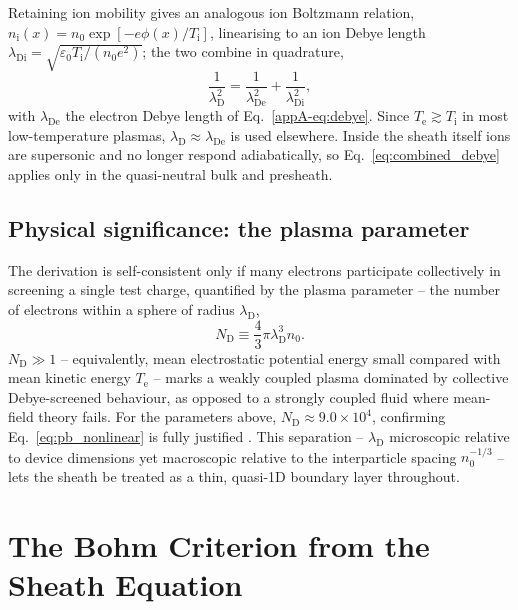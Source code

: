 Retaining ion mobility gives an analogous ion Boltzmann relation, $n_{\mathrm{i}}(x) = n_{0}\exp[-e\phi(x)/T_{\mathrm{i}}]$, linearising to an ion Debye length $\lambda_{\mathrm{Di}} = \sqrt{\varepsilon_{0}T_{\mathrm{i}}/(n_{0}e^{2})}$; the two combine in quadrature,
\begin{equation}
\frac{1}{\lambda_{\mathrm{D}}^{2}} = \frac{1}{\lambda_{\mathrm{De}}^{2}} + \frac{1}{\lambda_{\mathrm{Di}}^{2}},
\label{eq:combined_debye}
\end{equation}
with $\lambda_{\mathrm{De}}$ the electron Debye length of Eq.~\eqref{appA-eq:debye}. Since $T_{\mathrm{e}} \gtrsim T_{\mathrm{i}}$ in most low-temperature plasmas, $\lambda_{\mathrm{D}} \approx \lambda_{\mathrm{De}}$ is used elsewhere. Inside the sheath itself ions are supersonic and no longer respond adiabatically, so Eq.~\eqref{eq:combined_debye} applies only in the quasi-neutral bulk and presheath.

\subsection{Physical significance: the plasma parameter}

The derivation is self-consistent only if many electrons participate collectively in screening a single test charge, quantified by the plasma parameter -- the number of electrons within a sphere of radius $\lambda_{\mathrm{D}}$,
\begin{equation}
N_{\mathrm{D}} \equiv \frac{4}{3}\pi\lambda_{\mathrm{D}}^{3}n_{0}.
\label{eq:plasma_parameter}
\end{equation}
$N_{\mathrm{D}} \gg 1$ -- equivalently, mean electrostatic potential energy small compared with mean kinetic energy $T_{\mathrm{e}}$ -- marks a weakly coupled plasma dominated by collective Debye-screened behaviour, as opposed to a strongly coupled fluid where mean-field theory fails. For the parameters above, $N_{\mathrm{D}} \approx 9.0\times10^{4}$, confirming Eq.~\eqref{eq:pb_nonlinear} is fully justified \cite{ref0013}. This separation -- $\lambda_{\mathrm{D}}$ microscopic relative to device dimensions yet macroscopic relative to the interparticle spacing $n_{0}^{-1/3}$ -- lets the sheath be treated as a thin, quasi-1D boundary layer throughout.

\section{The Bohm Criterion from the Sheath Equation}
\label{appA-sec:bohm}


